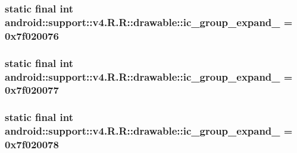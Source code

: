 \hypertarget{classandroid_1_1support_1_1v4_1_1_r_1_1drawable_96becdb7e10e82020603d44240f5c348}{
\subsubsection[{ic\_\-group\_\-expand\_\-07}]{\setlength{\rightskip}{0pt plus 5cm}static final int android::support::v4.R.R::drawable::ic\_\-group\_\-expand\_ = 0x7f020076}}
\label{classandroid_1_1support_1_1v4_1_1_r_1_1drawable_96becdb7e10e82020603d44240f5c348}


\hypertarget{classandroid_1_1support_1_1v4_1_1_r_1_1drawable_d650e16ab8ec7eb9203000c3ec78841f}{
\subsubsection[{ic\_\-group\_\-expand\_\-08}]{\setlength{\rightskip}{0pt plus 5cm}static final int android::support::v4.R.R::drawable::ic\_\-group\_\-expand\_ = 0x7f020077}}
\label{classandroid_1_1support_1_1v4_1_1_r_1_1drawable_d650e16ab8ec7eb9203000c3ec78841f}


\hypertarget{classandroid_1_1support_1_1v4_1_1_r_1_1drawable_6b4ed4d756dbf797b12f0895645e3063}{
\subsubsection[{ic\_\-group\_\-expand\_\-09}]{\setlength{\rightskip}{0pt plus 5cm}static final int android::support::v4.R.R::drawable::ic\_\-group\_\-expand\_ = 0x7f020078}}
\label{classandroid_1_1support_1_1v4_1_1_r_1_1drawable_6b4ed4d756dbf797b12f0895645e3063}


